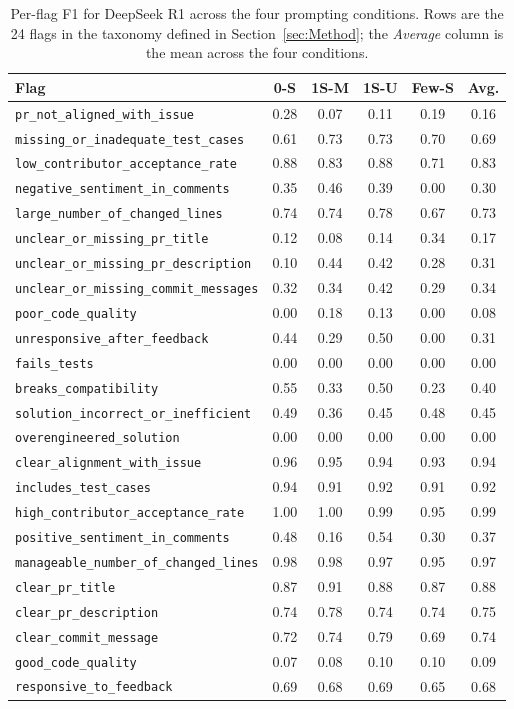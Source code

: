 \begin{table}[!htbp]
\centering
\caption{Per-flag F1 for DeepSeek R1 across the four prompting
conditions. Rows are the 24 flags in the taxonomy defined in
Section~\ref{sec:Method}; the \emph{Average} column is the mean across
the four conditions.}
\label{tab:perflag-deepseek-r1}
\small
\begin{tabular}{lccccc}
\toprule
Flag & 0-S & 1S-M & 1S-U & Few-S & Avg. \\
\midrule
\texttt{pr\_not\_aligned\_with\_issue} & 0.28 & 0.07 & 0.11 & 0.19 & 0.16 \\
\texttt{missing\_or\_inadequate\_test\_cases} & 0.61 & 0.73 & 0.73 & 0.70 & 0.69 \\
\texttt{low\_contributor\_acceptance\_rate} & 0.88 & 0.83 & 0.88 & 0.71 & 0.83 \\
\texttt{negative\_sentiment\_in\_comments} & 0.35 & 0.46 & 0.39 & 0.00 & 0.30 \\
\texttt{large\_number\_of\_changed\_lines} & 0.74 & 0.74 & 0.78 & 0.67 & 0.73 \\
\texttt{unclear\_or\_missing\_pr\_title} & 0.12 & 0.08 & 0.14 & 0.34 & 0.17 \\
\texttt{unclear\_or\_missing\_pr\_description} & 0.10 & 0.44 & 0.42 & 0.28 & 0.31 \\
\texttt{unclear\_or\_missing\_commit\_messages} & 0.32 & 0.34 & 0.42 & 0.29 & 0.34 \\
\texttt{poor\_code\_quality} & 0.00 & 0.18 & 0.13 & 0.00 & 0.08 \\
\texttt{unresponsive\_after\_feedback} & 0.44 & 0.29 & 0.50 & 0.00 & 0.31 \\
\texttt{fails\_tests} & 0.00 & 0.00 & 0.00 & 0.00 & 0.00 \\
\texttt{breaks\_compatibility} & 0.55 & 0.33 & 0.50 & 0.23 & 0.40 \\
\texttt{solution\_incorrect\_or\_inefficient} & 0.49 & 0.36 & 0.45 & 0.48 & 0.45 \\
\texttt{overengineered\_solution} & 0.00 & 0.00 & 0.00 & 0.00 & 0.00 \\
\texttt{clear\_alignment\_with\_issue} & 0.96 & 0.95 & 0.94 & 0.93 & 0.94 \\
\texttt{includes\_test\_cases} & 0.94 & 0.91 & 0.92 & 0.91 & 0.92 \\
\texttt{high\_contributor\_acceptance\_rate} & 1.00 & 1.00 & 0.99 & 0.95 & 0.99 \\
\texttt{positive\_sentiment\_in\_comments} & 0.48 & 0.16 & 0.54 & 0.30 & 0.37 \\
\texttt{manageable\_number\_of\_changed\_lines} & 0.98 & 0.98 & 0.97 & 0.95 & 0.97 \\
\texttt{clear\_pr\_title} & 0.87 & 0.91 & 0.88 & 0.87 & 0.88 \\
\texttt{clear\_pr\_description} & 0.74 & 0.78 & 0.74 & 0.74 & 0.75 \\
\texttt{clear\_commit\_message} & 0.72 & 0.74 & 0.79 & 0.69 & 0.74 \\
\texttt{good\_code\_quality} & 0.07 & 0.08 & 0.10 & 0.10 & 0.09 \\
\texttt{responsive\_to\_feedback} & 0.69 & 0.68 & 0.69 & 0.65 & 0.68 \\
\bottomrule
\end{tabular}
\end{table}
